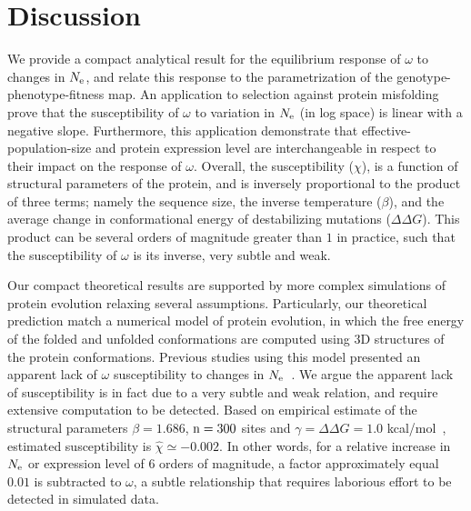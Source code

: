 \section{Discussion}

We provide a compact analytical result for the equilibrium response of $\omega$ to changes in $N_{\mathrm{e}}$, and relate this response to the parametrization of the genotype-phenotype-fitness map.
An application to selection against protein misfolding prove that the susceptibility of $\omega$ to variation in $N_{\mathrm{e}}$ (in log space) is linear with a negative slope.
Furthermore, this application demonstrate that \gls{effective-population-size} and protein expression level are interchangeable in respect to their impact on the response of $\omega$.
Overall, the susceptibility ($\chi$), is a function of structural parameters of the protein, and is inversely proportional to the product of three terms; namely the sequence size, the inverse temperature ($\beta$), and the average change in conformational energy of destabilizing mutations ($\Delta \Delta G$). 
This product can be several orders of magnitude greater than $1$ in practice, such that the susceptibility of $\omega$ is its inverse, very subtle and weak. 


Our compact theoretical results are supported by more complex simulations of protein evolution relaxing several assumptions.
Particularly, our theoretical prediction match a numerical model of protein evolution, in which the free energy of the folded and unfolded conformations are computed using $3$D structures of the protein conformations.
Previous studies using this model presented an apparent lack of $\omega$ susceptibility to changes in $N_{\mathrm{e}}$~\citep{Goldstein2013}.
We argue the apparent lack of susceptibility is in fact due to a very subtle and weak relation, and require extensive computation to be detected.
Based on empirical estimate of the structural parameters $\beta = 1.686$, $\text{n}=300$ sites and $\gamma=\Delta \Delta G = 1.0$ kcal/mol~\citep{Zeldovich2007}, estimated susceptibility is $\hat{\chi} \simeq -0.002$.
In other words, for a relative increase in $N_{\mathrm{e}}$ or expression level of $6$ orders of magnitude, a factor approximately equal $0.01$ is subtracted to $\omega$, a subtle relationship that requires laborious effort to be detected in simulated data.

